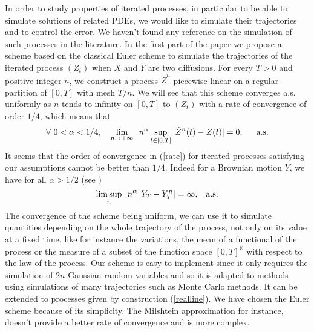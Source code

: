 \documentclass[a4paper, 11pt]{article}
\newcommand{\R}{\mathbb{R}}
\newcommand{\1}{\mathbf{1}}
\begin{document}
\noindent In order to study properties of iterated processes, in particular to be able to simulate solutions of related PDEs, we would like to simulate their trajectories and to control the error.  We haven't found any reference on the simulation of such processes in the literature. In the first part of the paper we propose a scheme based on the classical Euler scheme to simulate the trajectories of the iterated process $(Z_t)$ when $X$ and $Y$ are two diffusions. For every $T>0$ and positive integer $n$, we construct a process $\tilde{Z}^n$ piecewise linear on a regular partition of $[0,T]$ with mesh $T/n$. We will see that this scheme converges a.s. uniformly as $n$ tends to infinity on $[0,T]$ to $(Z_t)$ with a rate of convergence of order $1/4$, which means that
\begin{equation}
\label{rate}
\forall\ 0<\alpha<1/4,\quad \lim_{n\rightarrow +\infty}  \, \, \, n^\alpha\sup_{t\in[0,T]} |\tilde{Z}^n(t)-Z(t)|=0,\, \, \, \quad {\rm a.s.}
\end{equation}
It seems that the order of convergence in (\ref{rate}) for iterated processes satisfying our assumptions cannot be better than $1/4$. Indeed for a Brownian motion $Y$, we have for all $\alpha>1/2$ (see \cite{faure})
\begin{equation*}
\limsup_n  \, \, \, n^\alpha \, |Y_T-Y_T^n|=\infty, \, \, \, \, \, {\rm a.s.}
\end{equation*}
The convergence of the scheme being uniform, we can use it to simulate quantities depending on the whole trajectory of the process, not only on its value at a fixed time, like for instance the variations, the mean of a functional of the process or the measure of a subset of the function space $[0,T]^\R$ with respect to the law of the process. Our scheme is easy to implement since it only requires the simulation of $2n$ Gaussian random variables and so it is adapted to methods using simulations of many trajectories such as Monte Carlo methods. It can be extended to processes given by construction (\ref{realline}). We have chosen the Euler scheme because of its simplicity. The Milshtein approximation for instance, doesn't provide a better rate of convergence and is more complex.

\smallskip
\end{document}
